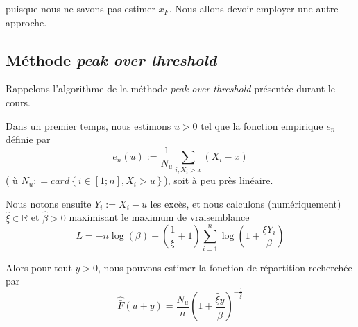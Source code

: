 \documentclass[../report.tex]{subfiles}
\begin{document}
puisque nous ne savons pas estimer $x_F$. Nous allons devoir employer une autre approche.


\subsection{Méthode \emph{peak over threshold}}
\par Rappelons l'algorithme de la méthode \emph{peak over threshold} présentée durant le cours. 
\par Dans un premier temps, nous estimons $u > 0$ tel que la fonction empirique $e_n$ définie par 
\begin{displaymath}
e_n \left( u \right) := \frac{1}{N_u} \sum\limits_{i, X_i > x} \left( X_i - x \right)
\end{displaymath}
( ù $N_u : = card \left\lbrace i \in \left[ 1; n \right], X_i > u \right\rbrace$), soit à peu près linéaire.
\par Nous notons ensuite $Y_i := X_i - u$ les excès, et nous calculons (numériquement) $\hat{\xi} \in \mathbb{R}$ et $\hat{\beta} > 0$ maximisant le maximum de vraisemblance 
\begin{displaymath}
L = - n \log \left( \beta \right) - \left( \frac{1}{\xi} + 1 \right) \sum\limits_{i = 1}^n \log \left( 1 + \frac{\xi Y_i}{\beta} \right)
\end{displaymath}
\par Alors pour tout $y > 0$, nous pouvons estimer la fonction de répartition recherchée par 
\begin{displaymath}
\hat{\bar{F}} \left( u + y \right) = \frac{N_u}{n} {\left( 1 + \frac{\hat{\xi} y}{\hat{\beta}} \right)}^{-\frac{1}{\hat{\xi}}}
\end{displaymath}
\end{document}
